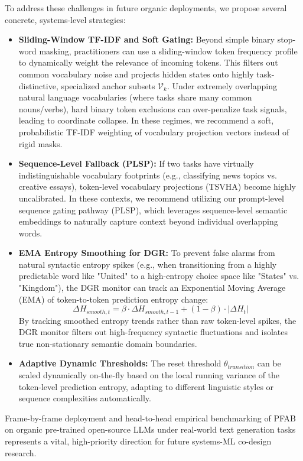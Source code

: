 To address these challenges in future organic deployments, we propose several concrete, systems-level strategies:
\begin{itemize}
  \item \textbf{Sliding-Window TF-IDF and Soft Gating:} Beyond simple binary stop-word masking, practitioners can use a sliding-window token frequency profile to dynamically weight the relevance of incoming tokens. This filters out common vocabulary noise and projects hidden states onto highly task-distinctive, specialized anchor subsets $\mathcal{V}_k$. Under extremely overlapping natural language vocabularies (where tasks share many common nouns/verbs), hard binary token exclusions can over-penalize task signals, leading to coordinate collapse. In these regimes, we recommend a soft, probabilistic TF-IDF weighting of vocabulary projection vectors instead of rigid masks.
  \item \textbf{Sequence-Level Fallback (PLSP):} If two tasks have virtually indistinguishable vocabulary footprints (e.g., classifying news topics vs. creative essays), token-level vocabulary projections (TSVHA) become highly uncalibrated. In these contexts, we recommend utilizing our prompt-level sequence gating pathway (PLSP), which leverages sequence-level semantic embeddings to naturally capture context beyond individual overlapping words.
  \item \textbf{EMA Entropy Smoothing for DGR:} To prevent false alarms from natural syntactic entropy spikes (e.g., when transitioning from a highly predictable word like "United" to a high-entropy choice space like "States" vs. "Kingdom"), the DGR monitor can track an Exponential Moving Average (EMA) of token-to-token prediction entropy change:
  \begin{equation}
    \Delta H_{smooth, t} = \beta \cdot \Delta H_{smooth, t-1} + (1-\beta) \cdot |\Delta H_t|
  \end{equation}
  By tracking smoothed entropy trends rather than raw token-level spikes, the DGR monitor filters out high-frequency syntactic fluctuations and isolates true non-stationary semantic domain boundaries.
  \item \textbf{Adaptive Dynamic Thresholds:} The reset threshold $\theta_{transition}$ can be scaled dynamically on-the-fly based on the local running variance of the token-level prediction entropy, adapting to different linguistic styles or sequence complexities automatically.
\end{itemize}
Frame-by-frame deployment and head-to-head empirical benchmarking of \textsc{PFAB} on organic pre-trained open-source LLMs under real-world text generation tasks represents a vital, high-priority direction for future systems-ML co-design research.

